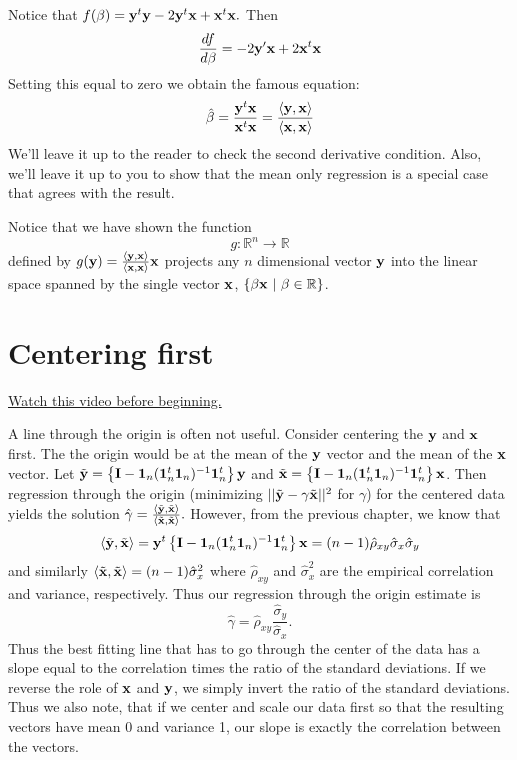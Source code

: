 Notice that
$
f(\beta) = \mathbf{y}^t \mathbf{y} - 2 \mathbf{y}^t \mathbf{x} + \mathbf{x}^t \mathbf{x}.
$
Then 
$$
\frac{df}{d\beta} = -2\mathbf{y}'\mathbf{x}  + 2 \mathbf{x}^t \mathbf{x} 
$$
Setting this equal to zero we obtain the famous equation:
$$
\hat \beta = \frac{\mathbf{y}^t \mathbf{x}}{\mathbf{x}^t \mathbf{x}}
=\frac{\langle \mathbf{y}, \mathbf{x} \rangle}{\langle \mathbf{x}, \mathbf{x} \rangle}
$$
We'll leave it up to the reader to check the second derivative 
condition. Also, we'll leave it up to you to show that the mean 
only regression is a  special case that agrees with the result.

Notice that we have shown the function
$$
g : \mathbb{R}^n \rightarrow \mathbb{R}
$$
defined by $g(\mathbf{y}) = \frac{\langle \mathbf{y}, \mathbf{x} \rangle}{\langle \mathbf{x}, \mathbf{x} \rangle}\mathbf{x}$ projects
any $n$ dimensional vector $\mathbf{y}$ into the linear space spanned
by the single vector $\mathbf{x}$, $\{\beta \mathbf{x} ~|~ \beta \in \mathbb{R}\}$.

\section{Centering first}

\href{https://www.youtube.com/watch?v=1ss_FYtiSHo&list=PLpl-gQkQivXhdgUCdaUQcdb31CRe8Mm2y&index=8}{Watch this video before beginning.}

A line through the origin is often not useful. Consider centering the
$\mathbf{y}$ and $\mathbf{x}$ first. The the origin would be at the mean of the
$\mathbf{y}$ vector and the mean of the $\mathbf{x}$ vector. Let
$\tilde {\mathbf{y}} = \left\{ \mathbf{I} - \mathbf{1}_n (\mathbf{1}_n^t \mathbf{1}_n)^{-1} \mathbf{1}_n^t \right\} \mathbf{y}$ and $\tilde {\mathbf{x}} = \left\{ \mathbf{I} - \mathbf{1}_n (\mathbf{1}_n^t \mathbf{1}_n)^{-1} \mathbf{1}_n^t \right\} \mathbf{x}$. Then regression through the origin (minimizing
$||\tilde {\mathbf{y}} - \gamma \tilde {\mathbf{x}}||^2$ for $\gamma$)
for the centered data yields
the solution 
$
\hat \gamma = \frac{\langle \tilde {\mathbf{y}}, \tilde {\mathbf{x}} \rangle}{\langle \tilde {\mathbf{x}}, \tilde {\mathbf{x}} \rangle}.
$
However, from the previous chapter, we know that
$$
\langle \tilde {\mathbf{y}}, \tilde {\mathbf{x}} \rangle = \mathbf{y}^t \left\{ \mathbf{I} - \mathbf{1}_n (\mathbf{1}_n^t \mathbf{1}_n)^{-1} \mathbf{1}_n^t \right\} \mathbf{x}
= (n-1)\hat{\rho}_{xy} \hat{\sigma}_x \hat{\sigma}_y
$$
and similarly $\langle \tilde {\mathbf{x}}, \tilde {\mathbf{x}} \rangle = (n-1)\hat{\sigma}_x^2$
where $\hat \rho_{xy}$ and $\hat{\sigma}_x^2$ are the empirical correlation and
variance, respectively. Thus our regression through the origin estimate is
$$
\hat \gamma = \hat{\rho}_{xy} \frac{\hat{\sigma}_y}{\hat{\sigma}_x}.
$$
Thus the best fitting line that has to go through the center of the data
has a slope equal to the correlation times the ratio of the standard deviations.
If we reverse the role of $\mathbf{x}$ and $\mathbf{y}$, we simply invert the ratio of the
standard deviations. Thus we also note, that if we center and scale our
data first so that the resulting vectors have mean 0 and variance 1, our
slope is exactly the correlation between the vectors.

